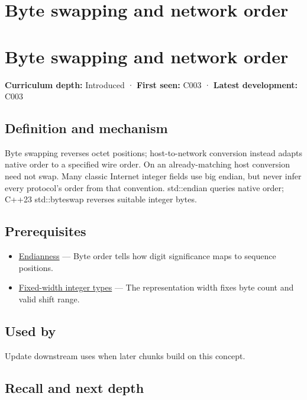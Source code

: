 \hypertarget{appendix-11ba36693aa2}{}
\section*{Byte swapping and network order}
\section{Byte swapping and network order}\label{appendix-11ba36693aa2-byte-swapping-and-network-order}

\textbf{Curriculum depth:} Introduced · \textbf{First seen:} C003 · \textbf{Latest development:} C003

\subsection{Definition and mechanism}\label{appendix-11ba36693aa2-definition-and-mechanism}

Byte swapping reverses octet positions; host-to-network conversion instead adapts native order to a specified wire order. On an already-matching host conversion need not swap. Many classic Internet integer fields use big endian, but never infer every protocol's order from that convention. std::endian queries native order; C++23 std::byteswap reverses suitable integer bytes.

\subsection{Prerequisites}\label{appendix-11ba36693aa2-prerequisites}

\begin{itemize}
\tightlist
\item
  \hyperref[appendix-bc07c3d25b18]{Endianness} --- Byte order tells how digit significance maps to sequence positions.
\item
  \hyperref[appendix-cc04044b5782]{Fixed-width integer types} --- The representation width fixes byte count and valid shift range.
\end{itemize}

\subsection{Used by}\label{appendix-11ba36693aa2-used-by}

Update downstream uses when later chunks build on this concept.

\subsection{Recall and next depth}\label{appendix-11ba36693aa2-recall-and-next-depth}

